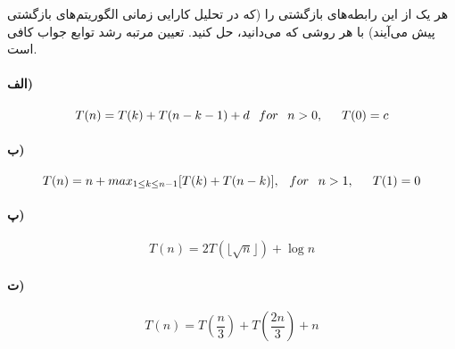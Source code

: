 \documentclass[]{article}
\begin{document}
هر یک از این رابطه‌های بازگشتی را (که در تحلیل کارایی زمانی الگوریتم‌های بازگشتی پیش می‌آیند) با هر روشی که می‌دانید، حل کنید. تعیین مرتبه رشد توابع جواب کافی است. 
\paragraph[1.1]{الف)}
$$T(n) = T(k) + T(n - k -1) + d \hspace{0.75em} for \hspace{0.75em} n > 0, \hspace{1.5em} T(0) = c$$
\paragraph[1.2]{ب)}
$$T(n) = n + max_{1 \le k \le n-1}[T(k) + T(n - k)], \hspace{0.75em} for \hspace{0.75em} n > 1, \hspace{1.5em} T(1) = 0$$
\paragraph[1.2]{پ)}
$$T(n) = 2T(\lfloor \sqrt{n} \rfloor) + \log n$$
\paragraph[1.2]{ت)}
$$T(n) = T(\frac{n}{3}) + T(\frac{2n}{3}) + n$$
\end{document}
